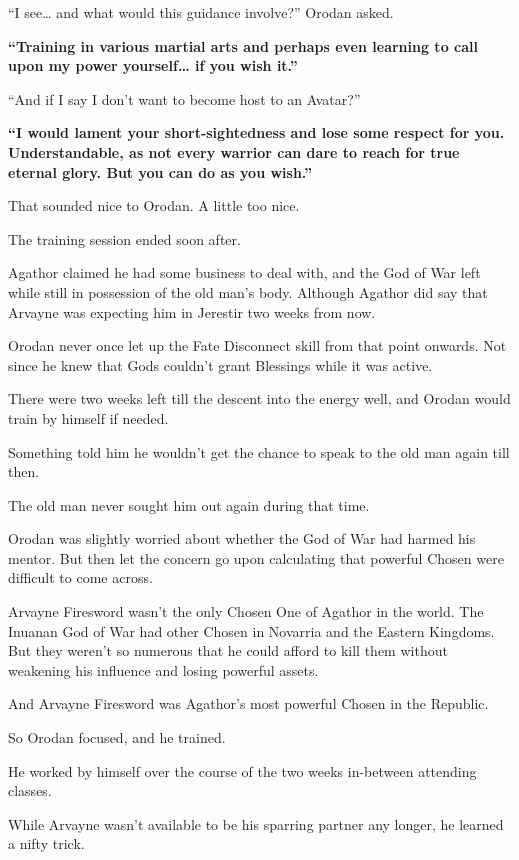 \documentclass[a4paper,10pt]{book}
\begin{document}
“I see… and what would this guidance involve?” Orodan asked.\par
\textbf{“Training in various martial arts and perhaps even learning to call upon my power yourself… if you wish it.”}\par
“And if I say I don’t want to become host to an Avatar?”\par
\textbf{“I would lament your short-sightedness and lose some respect for you. Understandable, as not every warrior can dare to reach for true eternal glory. But you can do as you wish.”}\par
That sounded nice to Orodan. A little too nice.\par
The training session ended soon after.\par
Agathor claimed he had some business to deal with, and the God of War left while still in possession of the old man’s body. Although Agathor did say that Arvayne was expecting him in Jerestir two weeks from now.\par
Orodan never once let up the Fate Disconnect skill from that point onwards. Not since he knew that Gods couldn't grant Blessings while it was active.\par
There were two weeks left till the descent into the energy well, and Orodan would train by himself if needed.\par
Something told him he wouldn’t get the chance to speak to the old man again till then.\par
\par
The old man never sought him out again during that time.\par
Orodan was slightly worried about whether the God of War had harmed his mentor. But then let the concern go upon calculating that powerful Chosen were difficult to come across.\par
Arvayne Firesword wasn’t the only Chosen One of Agathor in the world. The Inuanan God of War had other Chosen in Novarria and the Eastern Kingdoms. But they weren’t so numerous that he could afford to kill them without weakening his influence and losing powerful assets.\par
And Arvayne Firesword was Agathor's most powerful Chosen in the Republic.\par
So Orodan focused, and he trained.\par
He worked by himself over the course of the two weeks in-between attending classes.\par
While Arvayne wasn’t available to be his sparring partner any longer, he learned a nifty trick.\par
\end{document}
